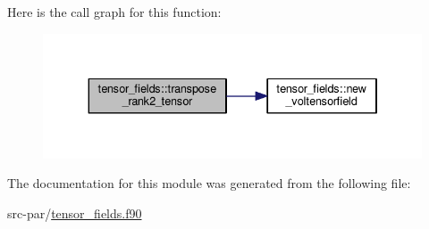 Here is the call graph for this function\-:\nopagebreak
\begin{figure}[H]
\begin{center}
\leavevmode
\includegraphics[width=334pt]{classtensor__fields_a1dc0528667ffde3ad78991670c841626_cgraph}
\end{center}
\end{figure}




The documentation for this module was generated from the following file\-:\begin{DoxyCompactItemize}
\item 
src-\/par/\hyperlink{tensor__fields_8f90}{tensor\-\_\-fields.\-f90}\end{DoxyCompactItemize}
